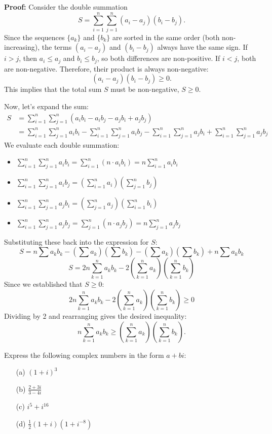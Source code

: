 \textbf{Proof:}
Consider the double summation
\[ S = \sum_{i=1}^n \sum_{j=1}^n (a_i - a_j)(b_i - b_j). \]
Since the sequences $\{a_k\}$ and $\{b_k\}$ are sorted in the same order (both non-increasing), the terms $(a_i - a_j)$ and $(b_i - b_j)$ always have the same sign. If $i>j$, then $a_i \le a_j$ and $b_i \le b_j$, so both differences are non-positive. If $i<j$, both are non-negative. Therefore, their product is always non-negative:
\[ (a_i - a_j)(b_i - b_j) \geq 0. \]
This implies that the total sum $S$ must be non-negative, $S \geq 0$.

Now, let's expand the sum:
\begin{align*}
S &= \sum_{i=1}^n \sum_{j=1}^n (a_i b_i - a_i b_j - a_j b_i + a_j b_j) \\
&= \sum_{i=1}^n \sum_{j=1}^n a_i b_i - \sum_{i=1}^n \sum_{j=1}^n a_i b_j - \sum_{i=1}^n \sum_{j=1}^n a_j b_i + \sum_{i=1}^n \sum_{j=1}^n a_j b_j
\end{align*}
We evaluate each double summation:
\begin{itemize}
\item \( \sum_{i=1}^n \sum_{j=1}^n a_i b_i = \sum_{i=1}^n \left( n \cdot a_i b_i \right) = n \sum_{i=1}^n a_i b_i \)
\item \( \sum_{i=1}^n \sum_{j=1}^n a_i b_j = \left( \sum_{i=1}^n a_i \right) \left( \sum_{j=1}^n b_j \right) \)
\item \( \sum_{i=1}^n \sum_{j=1}^n a_j b_i = \left( \sum_{j=1}^n a_j \right) \left( \sum_{i=1}^n b_i \right) \)
\item \( \sum_{i=1}^n \sum_{j=1}^n a_j b_j = \sum_{j=1}^n \left( n \cdot a_j b_j \right) = n \sum_{j=1}^n a_j b_j \)
\end{itemize}
Substituting these back into the expression for $S$:
\[
S = n \sum a_k b_k - \left(\sum a_k\right)\left(\sum b_k\right) - \left(\sum a_k\right)\left(\sum b_k\right) + n \sum a_k b_k
\]
\[
S = 2n \sum_{k=1}^n a_k b_k - 2 \left( \sum_{k=1}^n a_k \right) \left( \sum_{k=1}^n b_k \right)
\]
Since we established that $S \geq 0$:
\[
2n \sum_{k=1}^n a_k b_k - 2 \left( \sum_{k=1}^n a_k \right) \left( \sum_{k=1}^n b_k \right) \geq 0
\]
Dividing by 2 and rearranging gives the desired inequality:
\[
n \sum_{k=1}^n a_k b_k \geq \left( \sum_{k=1}^n a_k \right) \left( \sum_{k=1}^n b_k \right).
\]

\begin{problembox}
Express the following complex numbers in the form \( a + bi \):

\begin{enumerate}
\item[(a)] \( (1 + i)^3 \)
\item[(b)] \( \frac{2 + 3i}{3 - 4i} \)
\item[(c)] \( i^5 + i^{16} \)
\item[(d)] \( \frac{1}{2}(1 + i)(1 + i^{-8}) \)
\end{enumerate}
\end{problembox}

